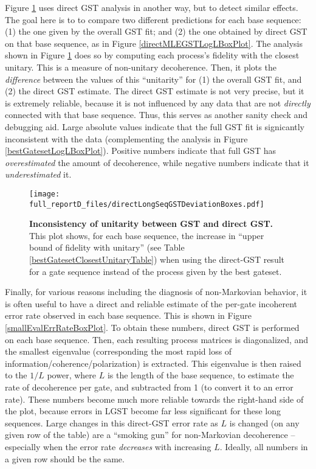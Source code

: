 {Figure \ref{directMLEGSTDeviationBoxPlot} uses direct GST analysis in another way, but to detect similar effects.   The goal here is to to compare two different predictions for each base sequence:  (1) the one given by the overall GST fit; and (2) the one obtained by direct GST on that base sequence, as in Figure \ref{directMLEGSTLogLBoxPlot}.  The analysis shown in Figure \ref{directMLEGSTDeviationBoxPlot} does so by computing each process's fidelity with the closest unitary.  This is a measure of non-unitary decoherence.  Then, it plots the \emph{difference} between the values of this ``unitarity'' for (1) the overall GST fit, and (2) the direct GST estimate.  The direct GST estimate is not very precise, but it is extremely reliable, because it is not influenced by any data that are not \emph{directly} connected with that base sequence.  Thus, this serves as another sanity check and debugging aid.  Large absolute values indicate that the full GST fit is signicantly inconsistent with the data (complementing the analysis in Figure \ref{bestGatesetLogLBoxPlot}).  Positive numbers indicate that full GST has \emph{overestimated} the amount of decoherence, while negative numbers indicate that it \emph{underestimated} it.

\begin{figure}
\begin{center}
\texttt{[image: full\_reportD\_files/directLongSeqGSTDeviationBoxes.pdf]}
\caption{\textbf{Inconsistency of unitarity between GST and direct GST.}  This plot shows, for each base sequence, the increase in ``upper bound of fidelity with unitary'' (see Table \ref{bestGatesetClosestUnitaryTable}) when using the direct-GST result for a gate sequence instead of the process given by the best gateset.\label{directMLEGSTDeviationBoxPlot}}
\end{center}
\end{figure}

Finally, for various reasons including the diagnosis of non-Markovian behavior, it is often useful to have a direct and reliable estimate of the per-gate incoherent error rate observed in each base sequence.  This is shown in Figure \ref{smallEvalErrRateBoxPlot}.  To obtain these numbers, direct GST is performed on each base sequence.  Then, each resulting process matrices is diagonalized, and the smallest eigenvalue (corresponding the most rapid loss of information/coherence/polarization) is extracted.  This eigenvalue is then raised to the $1/L$ power, where $L$ is the length of the base sequence, to estimate the rate of decoherence per gate, and subtracted from 1 (to convert it to an error rate).  These numbers become much more reliable towards the right-hand side of the plot, because errors in LGST become far less significant for these long sequences.  Large changes in this direct-GST error rate as $L$ is changed (on any given row of the table) are a ``smoking gun'' for non-Markovian decoherence -- especially when the error rate \emph{decreases} with increasing $L$.  Ideally, all numbers in a given row should be the same.

}
